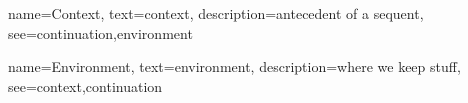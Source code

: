 
{
  name={Context},
  text={context},
  description={antecedent of a sequent},
  see={continuation,environment}
}

{
  name={Environment},
  text={environment},
  description={where we keep stuff},
  see={context,continuation}
}
